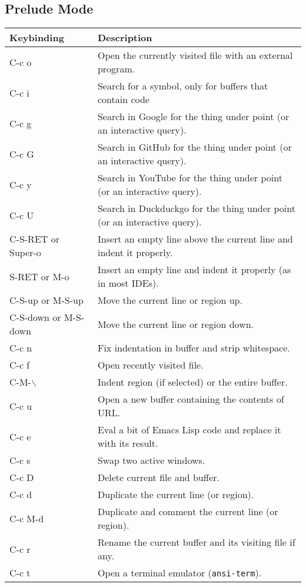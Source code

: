\documentclass[11pt]{article}
\begin{document}
\subsection{Prelude Mode}
\label{sec:orgbfeadc7}
\begin{center}
\begin{tabular}{ll}
Keybinding & Description\\
\hline
C-c o & Open the currently visited file with an external program.\\
C-c i & Search for a symbol, only for buffers that contain code\\
C-c g & Search in Google for the thing under point (or an interactive query).\\
C-c G & Search in GitHub for the thing under point (or an interactive query).\\
C-c y & Search in YouTube for the thing under point (or an interactive query).\\
C-c U & Search in Duckduckgo for the thing under point (or an interactive query).\\
C-S-RET or Super-o & Insert an empty line above the current line and indent it properly.\\
S-RET or M-o & Insert an empty line and indent it properly (as in most IDEs).\\
C-S-up or M-S-up & Move the current line or region up.\\
C-S-down or M-S-down & Move the current line or region down.\\
C-c n & Fix indentation in buffer and strip whitespace.\\
C-c f & Open recently visited file.\\
C-M-$\backslash$ & Indent region (if selected) or the entire buffer.\\
C-c u & Open a new buffer containing the contents of URL.\\
C-c e & Eval a bit of Emacs Lisp code and replace it with its result.\\
C-c s & Swap two active windows.\\
C-c D & Delete current file and buffer.\\
C-c d & Duplicate the current line (or region).\\
C-c M-d & Duplicate and comment the current line (or region).\\
C-c r & Rename the current buffer and its visiting file if any.\\
C-c t & Open a terminal emulator (\texttt{ansi-term}).\\

\end{tabular}
\end{center}
\end{document}
